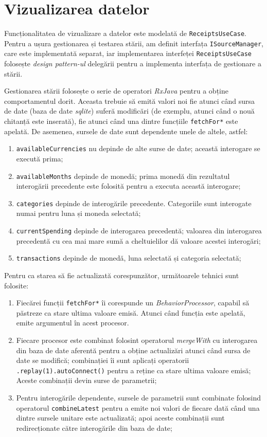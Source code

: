 \section{Vizualizarea datelor}

Funcționalitatea de vizualizare a datelor este modelată de \texttt{ReceiptsUseCase}. Pentru a ușura gestionarea și testarea stării, am definit interfața \texttt{ISourceManager}, care este implementată separat, iar implementarea interfeței \texttt{ReceiptsUseCase} folosește \emph{design pattern-ul} delegării pentru a implementa interfața de gestionare a stării.



Gestionarea stării folosește o serie de operatori \emph{RxJava} pentru a obține comportamentul dorit. Aceasta trebuie să emită valori noi fie atunci când sursa de date (baza de date \emph{sqlite}) suferă modificări (de exemplu, atunci când o nouă chitanță este inserată), fie atunci când una dintre funcțiile \texttt{fetchFor*} este apelată. De asemenea, sursele de date sunt dependente unele de altele, astfel:
\begin{enumerate}
  \item \texttt{availableCurrencies} nu depinde de alte surse de date; această interogare se execută prima;
  \item \texttt{availableMonths} depinde de monedă; prima monedă din rezultatul interogării precedente este folosită pentru a executa această interogare;
  \item \texttt{categories} depinde de interogările precedente. Categoriile sunt interogate numai pentru luna și moneda selectată; 
  \item \texttt{currentSpending} depinde de interogarea precedentă; valoarea din interogarea precedentă cu cea mai mare sumă a cheltuielilor dă valoare acestei interogări;
  \item \texttt{transactions} depinde de monedă, luna selectată și categoria selectată;
\end{enumerate}

Pentru ca starea să fie actualizată corespunzător, următoarele tehnici sunt folosite:
\begin{enumerate}
  \item Fiecărei funcții \texttt{fetchFor*} îi corespunde un \emph{BehaviorProcessor}, capabil să păstreze ca stare ultima valoare emisă. Atunci când funcția este apelată, emite argumentul în acest procesor.
  \item Fiecare procesor este combinat folosint operatorul \emph{mergeWith} cu interogarea din baza de date aferentă pentru a obține actualizări atunci când sursa de date se modifică; combinației îi sunt aplicați operatorii \texttt{.replay(1).autoConnect()} pentru a reține ca stare ultima valoare emisă; Aceste combinații devin surse de parametrii;
  \item Pentru interogările dependente, sursele de parametrii sunt combinate folosind operatorul \texttt{combineLatest} pentru a emite noi valori de fiecare dată când una dintre sursele unitare este actualizată; apoi aceste combinații sunt redirecționate către interogările din baza de date;
\end{enumerate}

